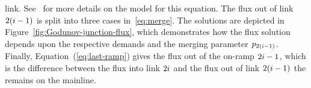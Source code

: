			link. See~\cite{Monache2013} for more details on the model for this
			equation. The flux out of link $2(i-1)$ is split into three cases
			in~\eqref{eq:merge}. The solutions are depicted in Figure~\ref{fig:Godunov-junction-flux},
			which demonstrates how the flux solution depends upon the respective
			demands and the merging parameter $p_{2\left(\link-1\right)}$. Finally,
			Equation~(\eqref{eq:last-ramp}) gives the flux out of the on-ramp $2i-1$,
			which is the difference between the flux into link $2i$ and the
			flux out of link $2\left(\link-1\right)$ the remains on the mainline.
			\begin{figure}
				\hfill{}\hfill{}
																

\end{figure}
